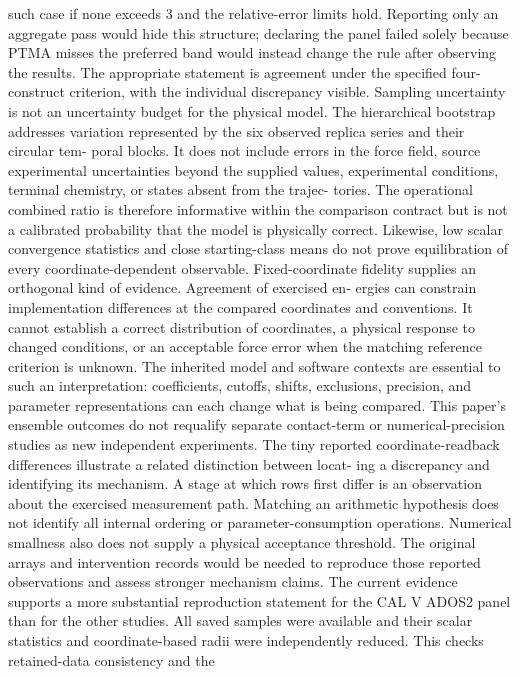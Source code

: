 \documentclass[11pt]{article}
\begin{document}
such case if none exceeds 3 and the relative-error limits hold. Reporting only an aggregate pass
would hide this structure; declaring the panel failed solely because PTMA misses the preferred band
would instead change the rule after observing the results. The appropriate statement is agreement
under the specified four-construct criterion, with the individual discrepancy visible.
Sampling uncertainty is not an uncertainty budget for the physical model. The hierarchical
bootstrap addresses variation represented by the six observed replica series and their circular tem-
poral blocks. It does not include errors in the force field, source experimental uncertainties beyond
the supplied values, experimental conditions, terminal chemistry, or states absent from the trajec-
tories. The operational combined ratio is therefore informative within the comparison contract but
is not a calibrated probability that the model is physically correct. Likewise, low scalar convergence
statistics and close starting-class means do not prove equilibration of every coordinate-dependent
observable.
Fixed-coordinate fidelity supplies an orthogonal kind of evidence. Agreement of exercised en-
ergies can constrain implementation differences at the compared coordinates and conventions. It
cannot establish a correct distribution of coordinates, a physical response to changed conditions, or
an acceptable force error when the matching reference criterion is unknown. The inherited model
and software contexts are essential to such an interpretation: coefficients, cutoffs, shifts, exclusions,
precision, and parameter representations can each change what is being compared. This paper’s
ensemble outcomes do not requalify separate contact-term or numerical-precision studies as new
independent experiments.
The tiny reported coordinate-readback differences illustrate a related distinction between locat-
ing a discrepancy and identifying its mechanism. A stage at which rows first differ is an observation
about the exercised measurement path. Matching an arithmetic hypothesis does not identify all
internal ordering or parameter-consumption operations. Numerical smallness also does not supply
a physical acceptance threshold. The original arrays and intervention records would be needed to
reproduce those reported observations and assess stronger mechanism claims.
The current evidence supports a more substantial reproduction statement for the CAL V ADOS2
panel than for the other studies. All saved samples were available and their scalar statistics and
coordinate-based radii were independently reduced. This checks retained-data consistency and the
\end{document}
